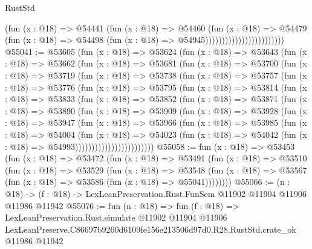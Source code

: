 \begin{lexlean}{RustStd}
\begin{coremodule}
                                          (fun (x : @18) =>
                                          @54441
                                            (fun (x : @18) =>
                                            @54460
                                              (fun (x : @18) =>
                                              @54479
                                                (fun (x : @18) =>
                                                @54498
                                                  (fun (x : @18) => @54945))))))))))))))))))))))))
@55041 := @53605
    (fun (x : @18) =>
    @53624
      (fun (x : @18) =>
      @53643
        (fun (x : @18) =>
        @53662
          (fun (x : @18) =>
          @53681
            (fun (x : @18) =>
            @53700
              (fun (x : @18) =>
              @53719
                (fun (x : @18) =>
                @53738
                  (fun (x : @18) =>
                  @53757
                    (fun (x : @18) =>
                    @53776
                      (fun (x : @18) =>
                      @53795
                        (fun (x : @18) =>
                        @53814
                          (fun (x : @18) =>
                          @53833
                            (fun (x : @18) =>
                            @53852
                              (fun (x : @18) =>
                              @53871
                                (fun (x : @18) =>
                                @53890
                                  (fun (x : @18) =>
                                  @53909
                                    (fun (x : @18) =>
                                    @53928
                                      (fun (x : @18) =>
                                      @53947
                                        (fun (x : @18) =>
                                        @53966
                                          (fun (x : @18) =>
                                          @53985
                                            (fun (x : @18) =>
                                            @54004
                                              (fun (x : @18) =>
                                              @54023
                                                (fun (x : @18) =>
                                                @54042
                                                  (fun (x : @18) => @54993))))))))))))))))))))))))
@55058 := fun (x : @18) =>
  @53453
    (fun (x : @18) =>
    @53472
      (fun (x : @18) =>
      @53491
        (fun (x : @18) =>
        @53510
          (fun (x : @18) =>
          @53529
            (fun (x : @18) =>
            @53548
              (fun (x : @18) => @53567 (fun (x : @18) => @53586 (fun (x : @18) => @55041))))))))
@55066 := (n : @18) ->
  (f : @18) -> LexLeanPreservation.Rust.FunSem @11902 @11904 @11906 @11986 @11942
@55076 := fun (n : @18) =>
  fun (f : @18) =>
  LexLeanPreservation.Rust.simulate
    @11902
    @11904
    @11906
    LexLeanPreserve.C86697b9260d6109fe156e213506d97d0.R28.RustStd.crate_ok
    @11986
    @11942
\end{coremodule}
\end{lexlean}
